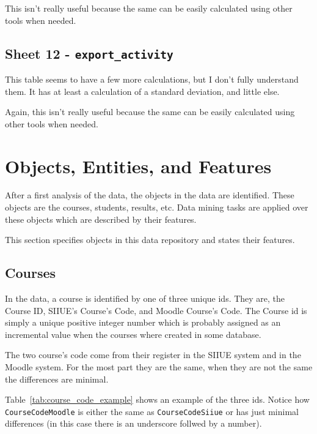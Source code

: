 This isn't really useful because the same can be easily calculated using other
tools when needed.

\subsection{Sheet 12 - \texttt{export\_activity}}

This table seems to have a few more calculations, but I don't fully understand
them. It has at least a calculation of a standard deviation, and little else.

Again, this isn't really useful because the same can be easily calculated using
other tools when needed.

\section{Objects, Entities, and Features}

After a first analysis of the data, the objects in the data are identified.
These objects are the courses, students, results, etc. Data mining tasks are
applied over these objects which are described by their features.

This section specifies objects in this data repository and states their
features.

\subsection{Courses}

In the data, a course is identified by one of three unique ids. They are, the
Course ID, SIIUE's Course's Code, and Moodle Course's Code. The Course id is
simply a unique positive integer number which is probably assigned as an
incremental value when the courses where created in some database.

The two course's code come from their register in the SIIUE system and in the
Moodle system. For the most part they are the same, when they are not the same
the differences are minimal.

Table~\ref{tab:course_code_example} shows an example of the three ids. Notice how \texttt{CourseCodeMoodle} is either the same as \texttt{CourseCodeSiiue} or has just minimal differences (in this case there is an underscore follwed by a number).

